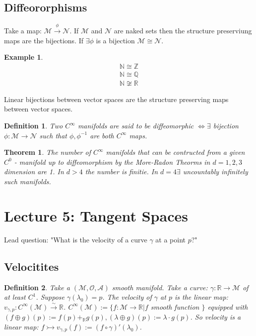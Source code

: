 \documentclass[10pt, oneside]{article}
\newcommand{\R}{\mathbb{R}}
\newcommand{\Z}{\mathbb{Z}}
\newcommand{\N}{\mathbb{N}}
\newcommand{\Q}{\mathbb{Q}}
\newcommand{\M}{\mathcal{M}}
\newtheorem{thm}{Theorem}
\newtheorem{defn}{Definition}
\newtheorem{example}{Example}
\begin{document}
   \subsection*{Diffeororphisms}
      Take a map: $\M \xrightarrow{\phi} \mathcal{N}$. If $\M$ and $\mathcal{N}$ are naked sets then the structure preserviung maps are the bijections. If $\exists \phi$ is a bijection $\M \cong \mathcal{N}$.
      \begin{example}
      \begin{align*}
         \N \cong \Z \\
         \N \cong \Q \\
         \N \not \cong \R
      \end{align*}
      \end{example}
      Linear bijections between vector spaces are the structure preserving maps between vector spaces.
      \begin{defn}
         Two $C^\infty$ manifolds are said to be diffeomorphic $\iff \exists$ bijection $\phi: \M \to \mathcal{N}$ such that $\phi, \phi^{-1}$ are both $C^\infty$ maps. 
      \end{defn}
      \begin{thm}
         The number of $C^\infty$ manifolds that can be contructed from a given $C^0$ - manifold up to diffeomorphism by the More-Radon Theorms in $d = 1,2,3$ dimension are 1. In $d > 4$ the number is finitie. In $d=4 \exists$ uncountably infinitely such manifolds. 
      \end{thm}
\section*{Lecture 5: Tangent Spaces}
      Lead question: "What is the velocity of a curve $\gamma$ at a point $p$?"
   \subsection*{Velocitites}
      \begin{defn}
         Take a $(\M,\mathcal{O}, \mathcal{A})$ smooth manifold. Take a curve: $\gamma: \R \to \M$ of at least $C^1$. Suppose $\gamma(\lambda_0) = p$. 
         The velocity of $\gamma$ at $p$ is the linear map: $v_{\gamma,p}: C^{\infty}(\M) \xrightarrow{\sim} \R$. $C^\infty (\M) := \{f:\M \to \R | f $ smooth function $\}$ equipped with $(f \oplus g)(p) := f(p) +_{\R} g(p), (\lambda \oplus g)(p):=\lambda \cdot g(p)$.
         So velocity is a linear map: $f \rightarrowtail v_{\gamma,p} (f) := (f \circ \gamma)'(\lambda_0)$.
      \end{defn}
\end{document}
